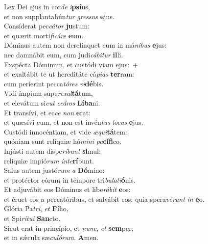 \oddverse Lex Dei ejus in cor\textit{de} \textit{i}\textbf{psí}us,~\*\\
\oddverse et non supplantabún\textit{tur} \textit{gres}\textit{sus} \textbf{e}jus.\\
\evenverse Consíderat pec\textit{cá}\textit{tor} \textbf{ju}stum:~\*\\
\evenverse et quærit morti\textit{fi}\textit{cá}\textit{re} \textbf{e}um.\\
\oddverse Dóminus autem non derelínquet eum in má\textit{ni}\textit{bus} \textbf{e}jus:~\*\\
\oddverse nec damnábit eum, cum judi\textit{cá}\textit{bi}\textit{tur} \textbf{il}li.\\
\evenverse Exspécta Dóminum, et custódi viam ejus:~+\\
\evenverse  et exaltábit te ut hereditáte cá\textit{pi}\textit{as} \textbf{ter}ram:~\*\\
\evenverse cum períerint pecca\textit{tó}\textit{res} \textit{vi}\textbf{dé}bis.\\
\oddverse Vidi ímpium supe\textit{re}\textit{xal}\textbf{tá}tum,~\*\\
\oddverse et elevátum si\textit{cut} \textit{ce}\textit{dros} \textbf{Lí}\textbf{ba}ni.\\
\evenverse Et transívi, et ec\textit{ce} \textit{non} \textbf{e}rat:~\*\\
\evenverse et quæsívi eum, et non est invén\textit{tus} \textit{lo}\textit{cus} \textbf{e}jus.\\
\oddverse Custódi innocéntiam, et vide \textit{æ}\textit{qui}\textbf{tá}tem:~\*\\
\oddverse quóniam sunt relíquiæ hó\textit{mi}\textit{ni} \textit{pa}\textbf{cí}\textbf{fi}co.\\
\evenverse Injústi autem dispe\textit{rí}\textit{bunt} \textbf{si}mul:~\*\\
\evenverse relíquiæ impió\textit{rum} \textit{in}\textit{te}\textbf{rí}bunt.\\
\oddverse Salus autem justó\textit{rum} \textit{a} \textbf{Dó}mino:~\*\\
\oddverse et protéctor eórum in témpore tri\textit{bu}\textit{la}\textit{ti}\textbf{ó}nis.\\
\evenverse Et adjuvábit eos Dóminus et libe\textit{rá}\textit{bit} \textbf{e}os:~\*\\
\evenverse et éruet eos a peccatóribus, et salvábit eos: quia spera\textit{vé}\textit{runt} \textit{in} \textbf{e}o.\\
\oddverse Glória Pa\textit{tri}, \textit{et} \textbf{Fí}lio,~\*\\
\oddverse et Spi\textit{rí}\textit{tu}\textit{i} \textbf{San}cto.\\
\evenverse Sicut erat in princípio, et \textit{nunc}, \textit{et} \textbf{sem}per,~\*\\
\evenverse et in sǽcula sæ\textit{cu}\textit{ló}\textit{rum}. \textbf{A}men.\\
